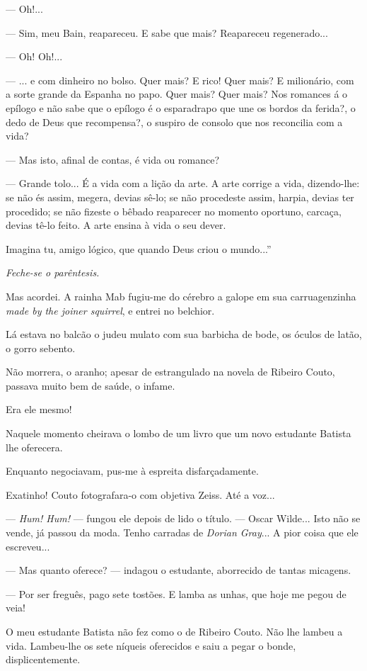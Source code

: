 --- Oh!...

--- Sim, meu Bain, reapareceu. E sabe que mais? Reapareceu regenerado...

--- Oh! Oh!...

--- ... e com dinheiro no bolso. Quer mais? E rico! Quer mais? E
milionário, com a sorte grande da Espanha no papo. Quer mais? Quer mais?
Nos romances á o epílogo e não sabe que o epílogo é o esparadrapo que
une os bordos da ferida?, o dedo de Deus que recompensa?, o suspiro de
consolo que nos reconcilia com a vida?

--- Mas isto, afinal de contas, é vida ou romance?

--- Grande tolo... É a vida com a lição da arte. A arte corrige a vida,
dizendo-lhe: se não és assim, megera, devias sê-lo; se não procedeste
assim, harpia, devias ter procedido; se não fizeste o bêbado reaparecer
no momento oportuno, carcaça, devias tê-lo feito. A arte ensina à vida o
seu dever.

Imagina tu, amigo lógico, que quando Deus criou o mundo...''

\emph{Feche-se o parêntesis.}

Mas acordei. A rainha Mab fugiu-me do cérebro a galope em sua
carruagenzinha \emph{made by the joiner squirrel}, e entrei no belchior.

Lá estava no balcão o judeu mulato com sua barbicha de bode, os óculos
de latão, o gorro sebento.

Não morrera, o aranho; apesar de estrangulado na novela de Ribeiro
Couto, passava muito bem de saúde, o infame.

Era ele mesmo!

Naquele momento cheirava o lombo de um livro que um novo estudante
Batista lhe oferecera.

Enquanto negociavam, pus-me à espreita disfarçadamente.

Exatinho! Couto fotografara-o com objetiva Zeiss. Até a voz...

--- \emph{Hum! Hum!} --- fungou ele depois de lido o título. --- Oscar
Wilde... Isto não se vende, já passou da moda. Tenho carradas de
\emph{Dorian Gray}... A pior coisa que ele escreveu...

--- Mas quanto oferece? --- indagou o estudante, aborrecido de tantas
micagens.

--- Por ser freguês, pago sete tostões. E lamba as unhas, que hoje me
pegou de veia!

O meu estudante Batista não fez como o de Ribeiro Couto. Não lhe lambeu
a vida. Lambeu-lhe os sete níqueis oferecidos e saiu a pegar o bonde,
displicentemente.

